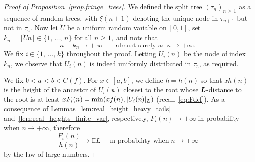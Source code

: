 \documentclass[10pt]{amsart}
\theoremstyle{definition}\newtheorem{defi}[theo]{Definition}\newtheorem{rema}[theo]{Remark}\newtheorem{exam}[theo]{Example}\newtheorem{exem}[theo]{Example}\newtheorem{nota}[theo]{Notation}
\newcommand{\bs}{\ensuremath{\boldsymbol}}
\newcommand{\bbE}{\mathbb{E}}
\begin{document}
\begin{proof}[Proof of Proposition~\ref{prop:fringe_trees}]
We defined the split tree $(\tau_n)_{n\,\geq\,1}$ as a sequence of random trees, with $\xi(n+1)$ denoting the unique node in $\tau_{n+1}$ but not in $\tau_n$. Now let $\widetilde U$ be a uniform random variable on $[0,1]$, set $k_n = \lceil \widetilde Un\rceil\in \{1,\,\ldots,\,n\}$ for all $n\geq 1,$ and note that
\begin{equation}\label{eq:n-kInfty}
n-k_n\to+\infty \qquad \text{almost surely as } n\to+\infty.
\end{equation}
We fix $i\in\{1,\,\dots,\,k\}$ throughout the proof. Letting $U_i(n)$ be the node of index $k_n$, we observe that $U_i(n)$ is indeed uniformly distributed in $\tau_n$, as required.


We fix $0<a< b<C(f)$. For $x\in[a,b]$, we define $h=h(n)$ so that $xh(n)$ is the height of the ancestor of $U_i(n)$ closest to the root whose $\bs L$-distance to the root is at least $xF_i(n)=\min(xf(n), |U_i(n)|_{\bs L})$ (recall~\eqref{eq:Fdef}). As a consequence of Lemmas~\ref{lem:real_height_heavy_tails} and~\ref{lem:real_heights_finite_var}, respectively, $F_i(n)\to+\infty$ in probability when $n\to+\infty$, therefore
\begin{equation}\label{eq:h_vs_f}
\frac{F_i(n)}{h(n)} \to \bbE L\quad\text{ in probability when }n\to+\infty
\end{equation}
by the law of large numbers.


\end{proof}
\end{document}
